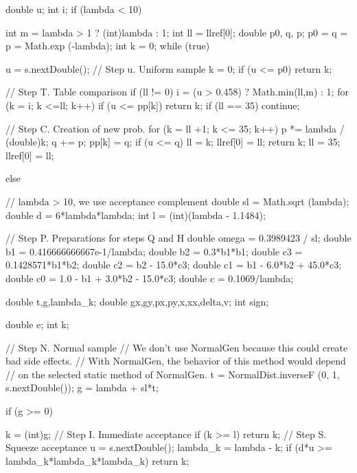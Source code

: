 \begin{code}
\begin{hide}
{      double u;
      int i;
      if (lambda < 10) {
         int m = lambda > 1 ? (int)lambda : 1;
         int ll = llref[0];
         double p0, q, p;
         p0 = q = p = Math.exp (-lambda);
         int k = 0;       
         while (true) {
            u = s.nextDouble();     // Step u. Uniform sample 
            k = 0;
            if (u <= p0) 
               return k;

            // Step T. Table comparison 
            if (ll != 0) {               
               i = (u > 0.458) ? Math.min(ll,m) : 1;
               for (k = i; k <=ll; k++)
               if (u <= pp[k]) return k;
               if (ll == 35) continue;
            }

            // Step C. Creation of new prob. 
            for (k = ll +1; k <= 35; k++) {
                p *= lambda / (double)k;
                q += p;
                pp[k] = q;
                if (u <= q) {
                   ll = k;
                   llref[0] = ll;
                   return k;
                }
            }
            ll = 35;
            llref[0] = ll;
         }
      }
      else { // lambda > 10, we use  acceptance complement
         double sl = Math.sqrt (lambda);
         double d = 6*lambda*lambda;
         int l = (int)(lambda - 1.1484);

         // Step P. Preparations for steps Q and H
         double omega = 0.3989423 / sl;
         double b1 = 0.416666666667e-1/lambda;
         double b2 = 0.3*b1*b1;
         double c3 = 0.1428571*b1*b2;
         double c2 = b2 - 15.0*c3;
         double c1 = b1 - 6.0*b2 + 45.0*c3;
         double c0 = 1.0 - b1 + 3.0*b2 - 15.0*c3;
         double c = 0.1069/lambda;

         double t,g,lambda_k;
         double gx,gy,px,py,x,xx,delta,v;
         int sign;

         double e;
         int k;

         // Step N. Normal sample 
         // We don't use NormalGen because this could create bad side effects.
         // With NormalGen, the behavior of this method would depend
         // on the selected static method of NormalGen.
         t = NormalDist.inverseF (0, 1, s.nextDouble());
         g = lambda + sl*t;

         if (g >= 0) {
            k = (int)g;
            // Step I. Immediate acceptance
            if (k >= l) 
               return k;
            // Step S. Squeeze acceptance
            u = s.nextDouble();
            lambda_k = lambda - k;
            if (d*u >= lambda_k*lambda_k*lambda_k)
               return k;

}}}
\end{hide}
\end{code}
